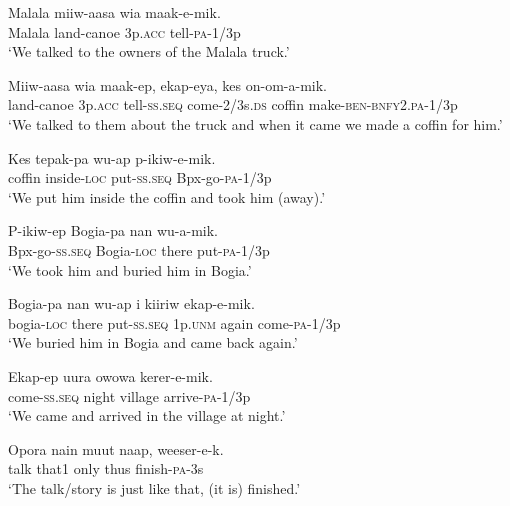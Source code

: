 \ea
\gll  Malala  miiw-aasa  wia  maak-e-mik. \\
Malala  land-canoe  3p.\textsc{acc}  tell-\textsc{pa}-1/3p \\
\glt ‘We talked to the owners of the Malala truck.’ \\
\z


\ea
\gll  Miiw-aasa  wia  maak-ep,  ekap-eya,  kes          on-om-a-mik. \\
land-canoe  3p.\textsc{acc}  tell-\textsc{ss.seq}  come-2/3s.\textsc{ds}  coffin   make-\textsc{ben}-\textsc{bnfy}2.\textsc{pa}-1/3p \\


\glt ‘We talked to them about the truck and when it came we made a coffin for him.’ \\
\z


\ea
\gll  Kes  tepak-pa  wu-ap  p-ikiw-e-mik. \\
coffin  inside-\textsc{loc}  put-\textsc{ss.seq}  Bpx-go-\textsc{pa}-1/3p \\
\glt ‘We put him inside the coffin and took him (away).’ \\
\z


\ea
\gll  P-ikiw-ep  Bogia-pa  nan  wu-a-mik. \\
Bpx-go-\textsc{ss.seq}  Bogia-\textsc{loc}  there  put-\textsc{pa}-1/3p \\
\glt ‘We took him and buried him in Bogia.’ \\
\z


\ea
\gll  Bogia-pa  nan  wu-ap  i  kiiriw  ekap-e-mik. \\
bogia-\textsc{loc}  there  put-\textsc{ss.seq}  1p.\textsc{unm}  again  come-\textsc{pa}-1/3p \\
\glt ‘We buried him in Bogia and came back again.’ \\
\z


\ea
\gll  Ekap-ep  uura  owowa  kerer-e-mik. \\
come-\textsc{ss.seq}  night  village  arrive-\textsc{pa}-1/3p \\
\glt ‘We came and arrived in the village at night.’ \\
\z


\ea
\gll  Opora  nain  muut  naap,  weeser-e-k. \\
talk  that1  only  thus  finish-\textsc{pa}-3s \\
\glt ‘The talk/story is just like that, (it is) finished.’ \\
\z


\setcounter{equation}{0}
